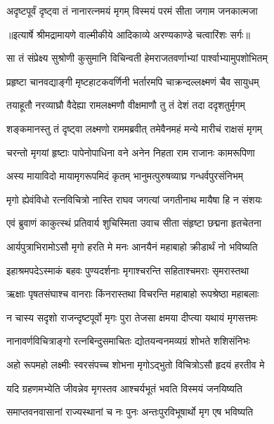 \twolineshloka
{अदृष्टपूर्वं दृष्ट्वा तं नानारत्नमयं मृगम्}
{विस्मयं परमं सीता जगाम जनकात्मजा} %


{॥इत्यार्षे श्रीमद्रामायणे वाल्मीकीये आदिकाव्ये अरण्यकाण्डे चत्वारिंशः सर्गः॥}


\twolineshloka
{सा तं संप्रेक्ष्य सुश्रोणी कुसुमानि विचिन्वती}
{हेमराजतवर्णाभ्यां पार्श्वाभ्यामुपशोभितम्} %

\twolineshloka
{प्रहृष्टा चानवद्याङ्गी मृष्टहाटकवर्णिनी}
{भर्तारमपि चाक्रन्दल्लक्ष्मणं चैव सायुधम्} %

\twolineshloka
{तयाहूतौ नरव्याघ्रौ वैदेह्या रामलक्ष्मणौ}
{वीक्षमाणौ तु तं देशं तदा ददृशतुर्मृगम्} %

\twolineshloka
{शङ्कमानस्तु तं दृष्ट्वा लक्ष्मणो राममब्रवीत्}
{तमेवैनमहं मन्ये मारीचं राक्षसं मृगम्} %

\twolineshloka
{चरन्तो मृगयां हृष्टाः पापेनोपाधिना वने}
{अनेन निहता राम राजानः कामरूपिणा} %

\twolineshloka
{अस्य मायाविदो मायामृगरूपमिदं कृतम्}
{भानुमत्पुरुषव्याघ्र गन्धर्वपुरसंनिभम्} %

\twolineshloka
{मृगो ह्येवंविधो रत्नविचित्रो नास्ति राघव}
{जगत्यां जगतीनाथ मायैषा हि न संशयः} %

\twolineshloka
{एवं ब्रुवाणं काकुत्स्थं प्रतिवार्य शुचिस्मिता}
{उवाच सीता संहृष्टा छद्मना हृतचेतना} %

\twolineshloka
{आर्यपुत्राभिरामोऽसौ मृगो हरति मे मनः}
{आनयैनं महाबाहो क्रीडार्थं नो भविष्यति} %

\twolineshloka
{इहाश्रमपदेऽस्माकं बहवः पुण्यदर्शनाः}
{मृगाश्चरन्ति सहिताश्चमराः सृमरास्तथा} %

\twolineshloka
{ऋक्षाः पृषतसंघाश्च वानराः किंनरास्तथा}
{विचरन्ति महाबाहो रूपश्रेष्ठा महाबलाः} %

\twolineshloka
{न चास्य सदृशो राजन्दृष्टपूर्वो मृगः पुरा}
{तेजसा क्षमया दीप्त्या यथायं मृगसत्तमः} %

\twolineshloka
{नानावर्णविचित्राङ्गो रत्नबिन्दुसमाचितः}
{द्योतयन्वनमव्यग्रं शोभते शशिसंनिभः} %

\twolineshloka
{अहो रूपमहो लक्ष्मीः स्वरसंपच्च शोभना}
{मृगोऽद्भुतो विचित्रोऽसौ हृदयं हरतीव मे} %

\twolineshloka
{यदि ग्रहणमभ्येति जीवन्नेव मृगस्तव}
{आश्चर्यभूतं भवति विस्मयं जनयिष्यति} %

\twolineshloka
{समाप्तवनवासानां राज्यस्थानां च नः पुनः}
{अन्तःपुरविभूषार्थो मृग एष भविष्यति} %

